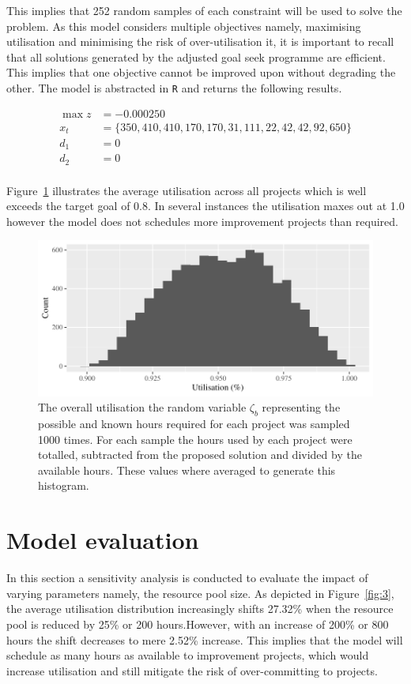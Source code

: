 \documentclass[a4paper,11pt]{article}
\begin{document}
This implies that 252 random samples of each constraint will be used to solve the problem. As this model considers multiple objectives namely, maximising utilisation and minimising the risk of over-utilisation it, it is important to recall that all solutions generated by the adjusted goal seek programme are efficient. This implies that one objective cannot be improved upon without degrading the other. The model is abstracted in \texttt{R} and returns the following results.

\begin{align}
	\max z &= -0.000250\\
	x_t &= \{350, 410, 410, 170, 170,  31, 111,  22,  42,  42,  92, 650\}\\
	d_1 &= 0 \\
	d_2 &= 0 \\
\end{align}

Figure~\ref{fig:2} illustrates the average utilisation across all projects which is well exceeds the target goal of 0.8. In several instances the utilisation maxes out at 1.0 however the model does not schedules more improvement projects than required.

\begin{figure}[]
\label{fig:2}
\includegraphics[width=15cm]{../Images/GGplotOverview}
\caption{The overall utilisation the random variable $\zeta_b$ representing the possible and known hours required for each project was sampled 1000 times. For each sample the hours used by each project were totalled, subtracted from the proposed solution and divided by the available hours. These values where averaged to generate this histogram.}
\end{figure}


\section{Model evaluation}
In this section a sensitivity analysis is conducted to evaluate the impact of varying parameters namely, the resource pool size.
As depicted in Figure~\ref{fig:3}, the average utilisation distribution increasingly shifts 27.32\% when the resource pool is reduced by 25\% or 200 hours.However, with an increase of 200\% or 800 hours the shift decreases to mere 2.52\% increase. This implies that the model will schedule as many hours as available to improvement projects, which would increase utilisation and still mitigate the risk of over-committing to projects. 
\end{document}
